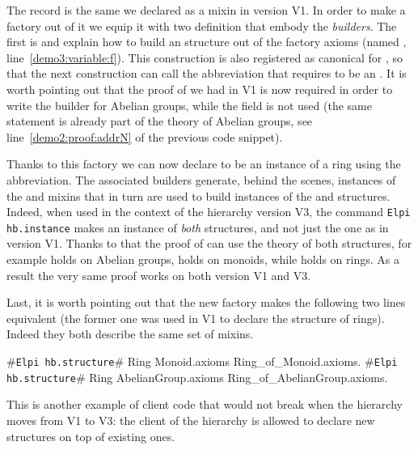 \documentclass[a4paper,UKenglish,cleveref, autoref]{lipics-v2019}
\newcommand{\mixin}{mixin}
\newcommand{\mixins}{mixins}
\newcommand{\factory}{factory}
\newcommand{\phantterm}{abbreviation}
\newcommand{\builder}{builder}
\newcommand{\hbinstance}{{\tt\color{dkgreen}Elpi hb.instance}}
\newcommand{\hbstructure}{{\tt\color{dkgreen}Elpi hb.structure}}
\theoremstyle{implem}
\theoremstyle{implem}
\theoremstyle{command}
\begin{document}
The record  is the same we declared as a \mixin{}
in version V1. In order to make a \factory{} out of it we equip it with
two definition that embody the \emph{\builder{}s}.
The first is  and
explain how to build an  structure out of the \factory{}
axioms (named , line~\ref{demo3:variable:f}).
This construction is also registered as canonical for ,
so that the next construction  can call
the  \phantterm{} that requires  to be
an .
It is worth pointing out that the proof of  we had in V1 is now
required in order to write the \builder{} for Abelian groups, while
the  field is not used (the same statement is already part of
the theory of Abelian groups, see line~\ref{demo2:proof:addrN} of the previous
code snippet).

Thanks to this \factory{} we can now declare  to be an instance
of a ring using the  \phantterm{}.
The associated \builder{}s generate, behind the scenes, instances of the
 and  \mixins{}
that in turn are used to build instances of the  and 
structures. Indeed, when used in the context of the hierarchy version V3,
the command \hbinstance{} 
makes  an instance of \emph{both} structures, and not just the 
one as in version V1.
Thanks to that the proof of  can use the theory of
both structures, for example  holds on Abelian groups,
 holds on monoids, while  holds on rings.
As a result the very same proof works on both
version V1 and V3.

Last, it is worth pointing out that the new \factory{} makes the following
two lines equivalent (the former one was used in V1 to declare
the structure of rings). Indeed they both describe the same set of \mixins{}.

\begin{coqcode}
#\hbstructure{}# Ring Monoid.axioms Ring_of_Monoid.axioms.
#\hbstructure{}# Ring AbelianGroup.axioms Ring_of_AbelianGroup.axioms.
\end{coqcode}

This is another example of client code that would not break when the hierarchy
moves from V1 to V3: the client of the hierarchy is allowed to declare new
structures on top of existing ones.
\end{document}
